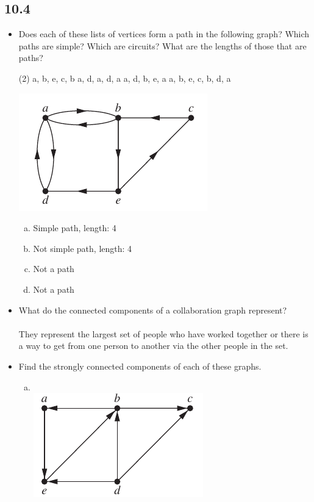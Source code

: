 \subsection{10.4}
\begin{itemize}
      \item[2.]  Does each of these lists of vertices form a path in the
            following graph? Which paths are simple? Which are circuits? What are
            the lengths of those that are paths?
            \begin{tasks}[item-format=\textit](2)
                  \task a, b, e, c, b
                  \task a, d, a, d, a
                  \task a, d, b, e, a
                  \task a, b, e, c, b, d, a
            \end{tasks}
            \includegraphics[scale = 0.7]{img/10_4_2_graph.png}\\
            \answer
            \begin{enumerate}[a.]
                  \item Simple path, length: 4
                  \item Not simple path, length: 4
                  \item Not a path
                  \item Not a path
            \end{enumerate}
      
      \item[8.]  What do the connected components of a collaboration
graph represent? \\
\answer \\
They represent the largest set of people who have worked together or there is 
a way to get from one person to another via the other people in the set.

\item[14.]  Find the strongly connected components of each of these
graphs.
\begin{enumerate}[a.]
      \item \text{} \\ 
      \includegraphics[scale=0.7]{img/10_4_14a_graph.png}


\end{enumerate}
\end{itemize}
